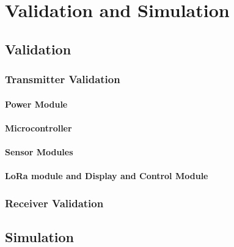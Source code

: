 \documentclass[class=report,11pt,crop=false]{standalone}
\begin{document}
\chapter{Validation and Simulation \label{ch:simulation}}


\cite{christian_wolff_physical_2024}
\section{Validation}

\subsection{Transmitter Validation}
\subsubsection{Power Module}

\subsubsection{Microcontroller}

\subsubsection{Sensor Modules}

\subsubsection{LoRa module and Display and Control Module}

\subsection{Receiver Validation}

\section{Simulation}


\ifstandalone

\printnoidxglossary[type=\acronymtype,nonumberlist]
\fi
\end{document}
